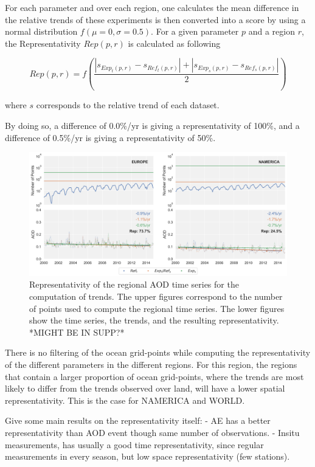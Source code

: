 \documentclass[journal abbreviation, manuscript]{copernicus}
\begin{document}
For each parameter and over each region, one calculates the mean difference in the relative trends of these experiments is then converted into a score by using a normal distribution $f(\mu=0, \sigma=0.5)$. For a given parameter $p$ and a region $r$, the Representativity $Rep(p,r)$ is calculated as following

\begin{equation}
 Rep(p, r) = f\left( \frac{\left| s_{Exp_{t}(p, r)}-s_{Ref_{t}(p, r)} \right| + \left| s_{Exp_{s}(p, r)}-s_{Ref_{s}(p, r)}\right| }{2} \right)
\end{equation}

where $s$ corresponds to the relative trend of each dataset.

By doing so, a difference of 0.0\%/yr is giving a representativity of 100\%, and a difference of 0.5\%/yr is giving a representativity of 50\%.

\begin{figure}[t]
 \includegraphics[width=16cm]{../scripts/figs/representativity.png}
 \caption{Representativity of the regional AOD time series for the computation of trends. The upper figures correspond to the number of points used to compute the regional time series. The lower figures show the time series, the trends, and the resulting representativity. *MIGHT BE IN SUPP?*}
 \label{representativity}
\end{figure}

There is no filtering of the ocean grid-points while computing the representativity of the different parameters in the different regions. For this region, the regions that contain a larger proportion of ocean grid-points, where the trends are most likely to differ from the trends observed over land, will have a lower spatial representativity. This is the case for NAMERICA and WORLD.

Give some main results on the representativity itself:
- AE has a better representativity than AOD event though same number of observations.
- Insitu measurements, has usually a good time representativity, since regular measurements in every season, but low space representativity (few stations).
\end{document}
